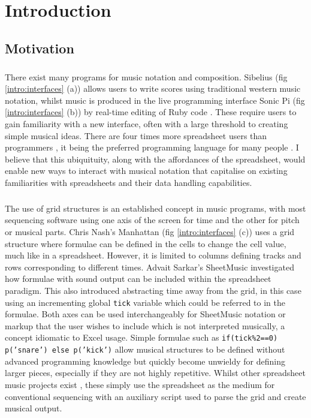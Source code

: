 
\chapter{Introduction}

\section{Motivation}

\paragraph{} There exist many programs for music notation and composition. Sibelius (fig \ref{intro:interfaces} (a)) allows users to write scores using traditional western music notation, whilst music is produced in the live programming interface Sonic Pi (fig \ref{intro:interfaces} (b)) by real-time editing of Ruby code \cite{aaron:pi}. These require users to gain familiarity with a new interface, often with a large threshold to creating simple musical ideas. There are four times more spreadsheet users than programmers \cite{scaffidi:estimating}, it being the preferred programming language for many people \cite{blackwell:functions}. I believe that this ubiquituity, along with the affordances of the spreadsheet, would enable new ways to interact with musical notation that capitalise on existing familiarities with spreadsheets and their data handling capabilities.

\paragraph{} The use of grid structures is an established concept in music programs, with most sequencing software using one axis of the screen for time and the other for pitch or musical parts. Chris Nash's Manhattan \cite{nash:manhattan} (fig \ref{intro:interfaces} (c)) uses a grid structure where formulae can be defined in the cells to change the cell value, much like in a spreadsheet. However, it is limited to columns defining tracks and rows corresponding to different times. Advait Sarkar's SheetMusic \cite{sarkar:sheetmusic} investigated how formulae with sound output can be included within the spreadsheet paradigm. This also introduced abstracting time away from the grid, in this case using an incrementing global \texttt{tick} variable which could be referred to in the formulae. Both axes can be used interchangeably for SheetMusic notation or markup that the user wishes to include which is not interpreted musically, a concept idiomatic to Excel usage. Simple formulae such as \texttt{if(tick\%2==0) p('snare') else p('kick')} allow musical structures to be defined without advanced programming knowledge but quickly become unwieldy for defining larger pieces, especially if they are not highly repetitive. Whilst other spreadsheet music projects exist \cite{hackaday:spreadsheet}, these simply use the spreadsheet as the medium for conventional sequencing with an auxiliary script used to parse the grid and create musical output.


